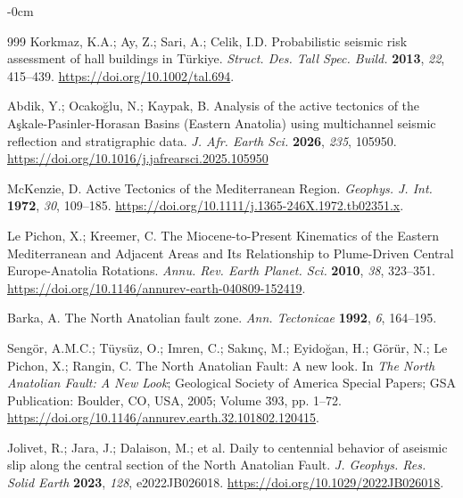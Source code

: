 \documentclass[data,article,accept,pdftex,moreauthors]{Definitions/mdpi}
\begin{document}
\begin{adjustwidth}{-\extralength}{0cm}
\begin{thebibliography}{999}
Korkmaz, K.A.; Ay, Z.; Sari, A.; Celik, I.D. Probabilistic seismic risk assessment of hall buildings in Türkiye. \emph{Struct. Des. Tall Spec. Build.} \textbf{2013}, \emph{22}, 415--439. \url{https://doi.org/10.1002/tal.694}.

Abdik, Y.; Ocako{\u g}lu, N.; Kaypak, B. Analysis of the active tectonics of the A{\c s}kale-Pasinler-Horasan Basins (Eastern Anatolia) using multichannel seismic reflection and stratigraphic data. \emph{J. Afr. Earth Sci.} \textbf{2026}, \emph{235}, 105950. \url{https://doi.org/10.1016/j.jafrearsci.2025.105950}

McKenzie, D. Active Tectonics of the Mediterranean Region. \emph{Geophys. J. Int.} \textbf{1972}, \emph{30}, 109--185. \url{https://doi.org/10.1111/j.1365-246X.1972.tb02351.x}. %

Le Pichon, X.; Kreemer, C. The Miocene-to-Present Kinematics of the Eastern Mediterranean and Adjacent Areas and Its Relationship to Plume-Driven Central Europe-Anatolia Rotations. \emph{Annu. Rev. Earth Planet. Sci.} \textbf{2010}, \emph{38}, 323--351. \url{https://doi.org/10.1146/annurev-earth-040809-152419}.

Barka, A. The North Anatolian fault zone. \emph{Ann. Tectonicae} \textbf{1992}, \emph{6}, 164--195.

Sengör, A.M.C.; Tüysüz, O.; Imren, C.; Sakınç, M.; Eyidoğan, H.; Görür, N.; Le Pichon, X.; Rangin, C. The North Anatolian Fault: A new look. In \emph{The North Anatolian Fault: A New Look}; Geological Society of America Special Papers; GSA Publication: Boulder, CO, USA, %
 2005; Volume 393, pp. 1--72. \url{https://doi.org/10.1146/annurev.earth.32.101802.120415}. %

Jolivet, R.; Jara, J.; Dalaison, M.; et al. Daily to centennial behavior of aseismic slip along the central section of the North Anatolian Fault. \emph{J. Geophys. Res. Solid Earth} \textbf{2023}, \emph{128}, e2022JB026018. \url{https://doi.org/10.1029/2022JB026018}.


\end{thebibliography}
\end{adjustwidth}
\end{document}
